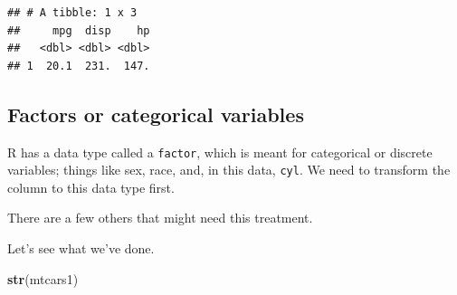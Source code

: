 \documentclass[12pt,letterpaperpaper,openany]{book}
\newenvironment{Shaded}{\begin{snugshade}}{\end{snugshade}}
\newcommand{\DataTypeTok}[1]{\textcolor[rgb]{0.13,0.29,0.53}{#1}}
\newcommand{\KeywordTok}[1]{\textcolor[rgb]{0.13,0.29,0.53}{\textbf{#1}}}
\newcommand{\NormalTok}[1]{#1}
\newcommand{\OperatorTok}[1]{\textcolor[rgb]{0.81,0.36,0.00}{\textbf{#1}}}
\newcommand{\StringTok}[1]{\textcolor[rgb]{0.31,0.60,0.02}{#1}}
\begin{document}
\begin{Shaded}
\end{Shaded}

\begin{verbatim}
## # A tibble: 1 x 3
##     mpg  disp    hp
##   <dbl> <dbl> <dbl>
## 1  20.1  231.  147.
\end{verbatim}

\hypertarget{factors-or-categorical-variables}{%
\subsection*{Factors or categorical variables}\label{factors-or-categorical-variables}}

R has a data type called a \texttt{factor}, which is meant for categorical or discrete variables; things like sex, race, and,
in this data, \texttt{cyl}. We need to transform the column to this data type first.

\begin{Shaded}
\end{Shaded}

There are a few others that might need this treatment.

\begin{Shaded}
\end{Shaded}

Let's see what we've done.

\begin{Shaded}
\begin{Highlighting}[]
\KeywordTok{str}\NormalTok{(mtcars1)}
\end{Highlighting}
\end{Shaded}
\end{document}
